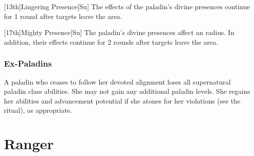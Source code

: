        [13th]{Lingering Presence}[Su]
        The effects of the paladin's divine presences continue for 1 round after targets leave the area.

        [17th]{Mighty Presence}[Su]
        The paladin's divine presences affect an \areahuge radius.
        In addition, their effects continue for 2 rounds after targets leave the area.

        \subsubsection{Ex-Paladins}
            A paladin who ceases to follow her devoted alignment loses all supernatural paladin class abilities.
            She may not gain any additional paladin levels.
            She regains her abilities and advancement potential if she atones for her violations (see the  ritual), as appropriate.

\section{Ranger}


